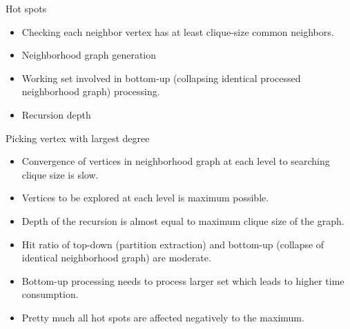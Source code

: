 \documentclass[landscape]{slides}
\begin{document}
\begin{slide}
	\begin{center}{\large Hot spots}\end{center}
	\begin{itemize}
		\setlength{\itemsep}{0pt}
		\setlength{\parskip}{20pt}
		\setlength{\parsep}{0pt}
		\item Checking each neighbor vertex has at least clique-size common neighbors.
		\item Neighborhood graph generation
		\item Working set involved in bottom-up (collapsing identical processed neighborhood graph) processing.
		\item Recursion depth
	\end{itemize}
\end{slide}


\begin{slide}
	\begin{center}{\large Picking vertex with largest degree}\end{center}
	\small
	\begin{itemize}
		\setlength{\itemsep}{0pt}
		\setlength{\parskip}{20pt}
		\setlength{\parsep}{0pt}
		\item Convergence of vertices in neighborhood graph at each level to searching clique size is slow.
		\item Vertices to be explored at each level is maximum possible.
		\item Depth of the recursion is almost equal to maximum clique size of the graph.
		\item Hit ratio of top-down (partition extraction) and bottom-up (collapse of identical neighborhood graph) are moderate.
		\item Bottom-up processing needs to process larger set which leads to higher time consumption.
		\item Pretty much all hot spots are affected negatively to the maximum.
	\end{itemize}
\end{slide}


\begin{slide}
\end{slide}
\end{document}
